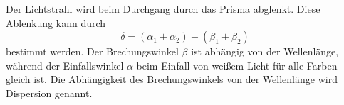     Der Lichtstrahl wird beim Durchgang durch das Prisma abglenkt.
    Diese Ablenkung kann durch
    \begin{equation}
        \delta = (\alpha_1 + \alpha_2) - (\beta_1 + \beta_2)
        \label{eqn:ablenkung}
    \end{equation}
    bestimmt werden.
    \label{sec:theorie:dispersion}
    Der Brechungswinkel $\beta$ ist abhängig von der Wellenlänge,
    während der Einfallswinkel $\alpha$ beim Einfall von weißem Licht für alle Farben gleich ist.
    Die Abhängigkeit des Brechungswinkels von der Wellenlänge wird Dispersion genannt.
